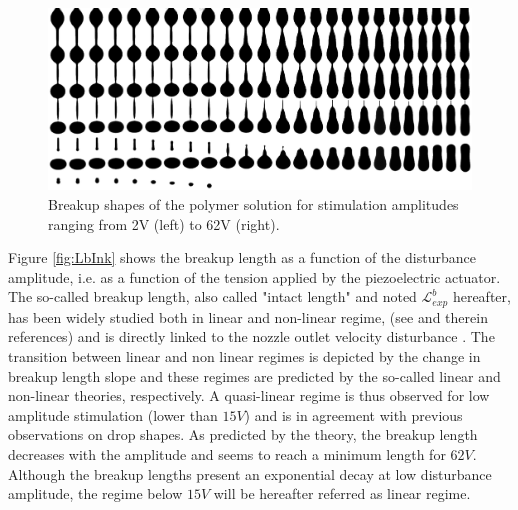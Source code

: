 \documentclass[onecolumn, 12pt]{asme2ej}
\begin{document}
\begin{figure}[h]
    \centering
    \includegraphics[width=15cm]{Figures/Fig2.eps}
    \caption{Breakup shapes of the polymer solution for stimulation amplitudes ranging from 2V (left) to 62V (right).} 
    \label{fig:expAll}
\end{figure}
Figure \ref{fig:LbInk} shows the breakup length as a function of the disturbance amplitude, i.e. as a function of the tension applied by the piezoelectric actuator. The so-called breakup length, also called "intact length" and noted $\mathcal{L}^b_{exp}$ hereafter, has been widely studied both in linear and non-linear regime, (see \cite{eggers2008physics} and therein references) and is directly linked to the nozzle outlet velocity disturbance \cite{pimbley1977satellite,rosello2018influence}. The transition between linear and non linear regimes is depicted by the change in breakup length slope and these regimes are predicted by the so-called linear and non-linear theories, respectively. A quasi-linear regime is thus observed for low  amplitude stimulation (lower than $15V$) and is in agreement with previous observations on drop shapes.
As predicted by the theory, the breakup length decreases with the amplitude and seems to reach a minimum length for $62V$. Although the breakup lengths present an exponential decay at low disturbance amplitude, the regime below $15V$ will be hereafter referred as linear regime.
\end{document}
